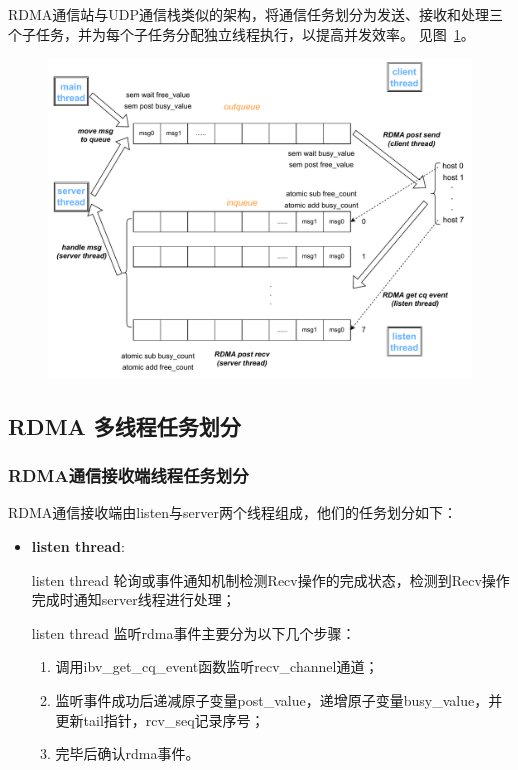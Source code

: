 {    RDMA通信站与UDP通信栈类似的架构，将通信任务划分为发送、接收和处理三个子任务，并为每个子任务分配独立线程执行，以提高并发效率。
    见图~\ref{fig:RDMA-communication-design}。

    \begin{figure}[H]
        \centering
        \includegraphics[width=1.0\textwidth]{Img/RDMA_design.drawio.pdf}
        \label{fig:RDMA-communication-design}
    \end{figure}


    \subsection{RDMA 多线程任务划分}

    \subsubsection{RDMA通信接收端线程任务划分}
    RDMA通信接收端由listen与server两个线程组成，他们的任务划分如下：

    \begin{itemize}
        \item \textbf{listen thread}:

              listen thread 轮询或事件通知机制检测Recv操作的完成状态，检测到Recv操作完成时通知server线程进行处理；

              listen thread 监听rdma事件主要分为以下几个步骤：
              \begin{enumerate}[leftmargin=*, nosep]
                  \item 调用ibv\_get\_cq\_event函数监听recv\_channel通道；
                  \item 监听事件成功后递减原子变量post\_value，递增原子变量busy\_value，并更新tail指针，rcv\_seq记录序号；
                  \item 完毕后确认rdma事件。
              \end{enumerate}


\end{itemize}}
